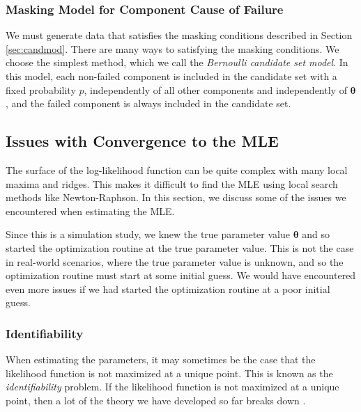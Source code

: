 \documentclass[
]{article}
\begin{document}
\hypertarget{masking-model-for-component-cause-of-failure}{%
\subsubsection*{Masking Model for Component Cause of
Failure}\label{masking-model-for-component-cause-of-failure}}

We must generate data that satisfies the masking conditions described in
Section \ref{sec:candmod}. There are many ways to satisfying the masking
conditions. We choose the simplest method, which we call the
\emph{Bernoulli candidate set model}. In this model, each non-failed
component is included in the candidate set with a fixed probability
\(p\), independently of all other components and independently of
\(\boldsymbol{\theta}\), and the failed component is always included in
the candidate set.

\hypertarget{sec:opt_rescale}{%
\subsection{Issues with Convergence to the MLE}\label{sec:opt_rescale}}

The surface of the log-likelihood function can be quite complex with
many local maxima and ridges. This makes it difficult to find the MLE
using local search methods like Newton-Raphson. In this section, we
discuss some of the issues we encountered when estimating the MLE.

Since this is a simulation study, we knew the true parameter value
\(\boldsymbol{\theta}\) and so started the optimization routine at the
true parameter value. This is not the case in real-world scenarios,
where the true parameter value is unknown, and so the optimization
routine must start at some initial guess. We would have encountered even
more issues if we had started the optimization routine at a poor initial
guess.

\hypertarget{identifiability}{%
\subsubsection*{Identifiability}\label{identifiability}}

When estimating the parameters, it may sometimes be the case that the
likelihood function is not maximized at a unique point. This is known as
the \emph{identifiability} problem. If the likelihood function is not
maximized at a unique point, then a lot of the theory we have developed
so far breaks down \citep{mclachlan2007algorithm}.
\end{document}
